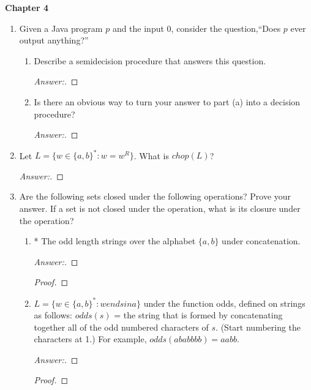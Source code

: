 \documentclass[10pt]{article}
\newcommand{\chtitle}[1]{\noindent \vspace{5mm}\textbf{Chapter #1}\vspace{3mm}}
\begin{document}
\chtitle{4}
\begin{enumerate}


\item
Given a Java program $p$ and the input $0$, consider the question,``Does $p$ ever output anything?''
\begin{enumerate}

\item
Describe a semidecision procedure that answers this question.
\begin{proof}[Answer:]
\end{proof}

\item
Is there an obvious way to turn your answer to part (a) into a decision procedure?
\begin{proof}[Answer:]
\end{proof}
\end{enumerate}


\item
Let $L = \{w \in \{a, b\}^*: w = w^R\}$.  What is $chop(L)$? 
\begin{proof}[Answer:]
\end{proof}


\item
Are the following sets closed under the following operations?  Prove your answer.  If a set is not closed under the operation, what is its closure under the operation?

\begin{enumerate}

\item
* The odd length strings over the alphabet $\{a, b\}$ under concatenation.
\begin{proof}[Answer:]
\end{proof}
\begin{proof}
\end{proof}

\item
$L = \{w \in \{a, b\}^* : w ends in a\}$ under the function odds, defined on strings as follows: $odds(s)$ = the string that is formed by concatenating together all of the odd numbered characters of $s$.  (Start numbering the characters at 1.)  For example, $odds(ababbbb) = aabb$.
\begin{proof}[Answer:]
\end{proof}
\begin{proof}
\end{proof}


\end{enumerate}
\end{enumerate}
\end{document}
